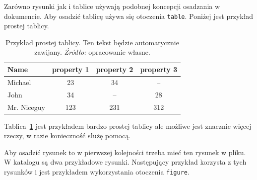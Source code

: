\documentclass[polish, twoside, 12pt, a4paper]{article}
\theoremstyle{definition}
\theoremstyle{plain}
\theoremstyle{remark}
\begin{document}
Zarówno rysunki jak i tablice używają podobnej koncepcji osadzania w dokumencie. Aby osadzić tablicę używa się otoczenia  \verb+table+. Poniżej jest przykład prostej tablicy.

\begin{table}[hbt]
  \centering

  \captionsetup{margin=10pt,font=small,labelfont=bf,width=.8\textwidth}

  \caption[Przykład prostej tablicy]{Przykład prostej tablicy. Ten tekst będzie automatycznie zawijany. \textit{Źródło:} opracowanie własne.}
  \label{tab:exceptional-table}

\vspace*{2ex}

  \begin{tabular}{lccc}
    Name        & property 1 & property 2 & property 3 \\ \hline
    Michael     & 23         & 34         & --         \\
    John        & 34         & --         & 28         \\
    Mr. Niceguy & 123        & 231        & 312        \\ \hline
  \end{tabular}
\end{table}

Tablica~\ref{tab:exceptional-table} jest przykładem bardzo prostej tablicy ale możliwe jest znacznie więcej rzeczy, w razie konieczność służę pomocą.

Aby osadzić rysunek to w pierwszej kolejności trzeba mieć ten rysunek w pliku. W katalogu są dwa przykładowe rysunki. Następujący przykład korzysta z tych rysunków i jest przykładem wykorzystania otoczenia \verb+figure+.
\end{document}
